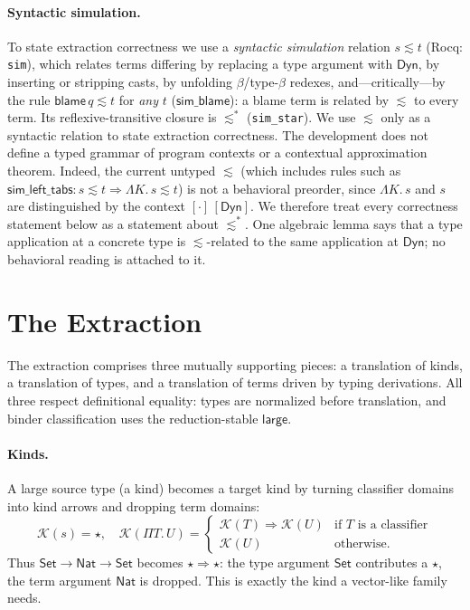 \documentclass[acmsmall,anonymous=false,nonacm]{acmart}
\newcommand{\dyn}{\ensuremath{\mathsf{Dyn}}}
\newcommand{\kstar}{\ensuremath{\star}}
\newcommand{\karr}{\ensuremath{\Rightarrow}}
\newcommand{\Set}{\ensuremath{\mathsf{Set}}}
\newcommand{\Nat}{\ensuremath{\mathsf{Nat}}}
\newcommand{\blame}[1]{\mathsf{blame}\,#1}
\newcommand{\extk}{\mathcal{K}}
\newcommand{\islarge}{\mathsf{large}}
\newcommand{\sepsim}{\mathrel{\lesssim}}
\begin{document}
\paragraph{Syntactic simulation.}
To state extraction correctness we use a \emph{syntactic simulation} relation
$s \sepsim t$ (Rocq: \texttt{sim}), which relates terms differing by replacing a
type argument with $\dyn$, by inserting or stripping casts, by unfolding
$\beta$/type-$\beta$ redexes, and---critically---by the rule
$\blame q \sepsim t$ for \emph{any} $t$ ($\mathsf{sim\_blame}$): a blame term
is related by $\sepsim$ to every term. Its reflexive-transitive closure is $\sepsim^{*}$
(\texttt{sim\_star}). We use $\sepsim$ only as a syntactic relation to state
extraction correctness. The development does not define a typed grammar of
program contexts or a contextual approximation theorem. Indeed, the current untyped
$\sepsim$ (which includes rules such as
$\mathsf{sim\_left\_tabs}\colon s \sepsim t \Rightarrow \Lambda K.\,s \sepsim t$)
is not a behavioral preorder, since $\Lambda K.\,s$ and $s$ are
distinguished by the context $[\cdot]\,[\dyn]$. We therefore treat every
correctness statement below as a statement about $\sepsim^{*}$. One algebraic
lemma says that a type application at a concrete type is $\sepsim$-related to
the same application at $\dyn$; no behavioral reading is attached to it.

\section{The Extraction}\label{sec:extraction}

The extraction comprises three mutually supporting pieces: a translation of
kinds, a translation of types, and a translation of terms driven by typing
derivations. All three respect definitional equality: types are normalized
before translation, and binder classification uses the reduction-stable
$\islarge$.

\paragraph{Kinds.}
A large source type (a kind) becomes a target kind by turning classifier domains
into kind arrows and dropping term domains:
\[
\extk(s) = \kstar, \quad
\extk(\Pi T.\,U) = \begin{cases}
  \extk(T) \karr \extk(U) & \text{if $T$ is a classifier} \\
  \extk(U) & \text{otherwise.}
\end{cases}
\]
Thus $\Set \to \Nat \to \Set$ becomes $\kstar \karr \kstar$: the type argument
$\Set$ contributes a $\kstar$, the term argument $\Nat$ is dropped. This is
exactly the kind a vector-like family needs.
\end{document}
